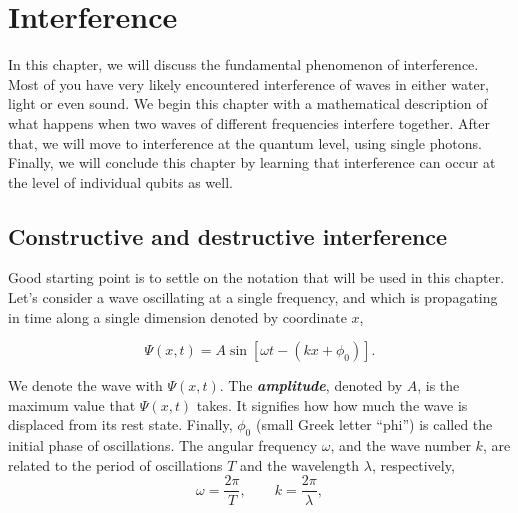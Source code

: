 \chapter{Interference}
\label{sec:6_interference}

In this chapter, we will discuss the fundamental phenomenon of interference.
Most of you have very likely encountered interference of waves in either water, light or even sound.
We begin this chapter with a mathematical description of what happens when two waves of different frequencies interfere together.
After that, we will move to interference at the quantum level, using single photons.
Finally, we will conclude this chapter by learning that interference can occur at the level of individual qubits as well.


\section{Constructive and destructive interference}
\label{sec:6-1_constructive_and_destructive_interference}


Good starting point is to settle on the notation that will be used in this chapter.
Let's consider a wave oscillating at a single frequency, and which is propagating in time along a single dimension denoted by coordinate $x$,

\begin{equation}
    \Psi(x,t) = A \sin [\omega t-(k x+\phi_0)].
    \label{eq:simple_wave}
\end{equation}

We denote the wave with $\Psi(x,t)$.
The \textbf{\emph{amplitude}}, denoted by $A$, is the maximum value that $\Psi(x,t)$ takes.
It signifies how how much the wave is displaced from its rest state.
Finally, $\phi_0$ (small Greek letter ``phi'') is called the initial phase of oscillations.
The angular frequency $\omega$, and the wave number $k$, are related to the period of oscillations $T$ and the wavelength $\lambda$, respectively,
\begin{equation}
    \omega=\frac{2 \pi}{T}, \qquad k=\frac{2 \pi}{\lambda},
    \label{eq:freq-period_k-wavelength}
\end{equation}

